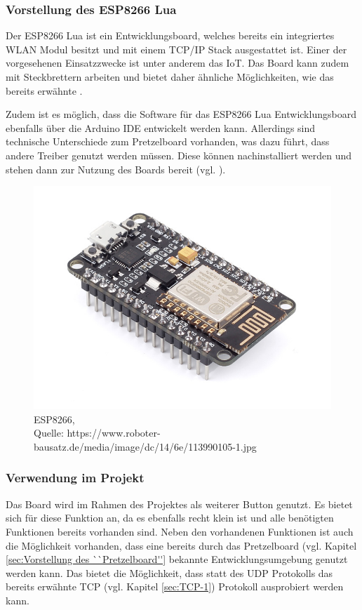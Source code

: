 \subsubsection{Vorstellung des ESP8266 Lua}        
\label{sec:Vorstellung des ESP8266} 

Der ESP8266 Lua ist ein Entwicklungsboard, welches bereits ein integriertes WLAN Modul besitzt und mit einem \ac{TCP}/\ac{IP} Stack ausgestattet ist. Einer der vorgesehenen Einsatzzwecke ist unter anderem das \ac{IoT}. Das Board kann zudem mit Steckbrettern arbeiten und bietet daher ähnliche Möglichkeiten, wie das bereits erwähnte . 

Zudem ist es möglich, dass die Software für das ESP8266 Lua Entwicklungsboard ebenfalls über die Arduino \ac{IDE} entwickelt werden kann. Allerdings sind technische Unterschiede zum Pretzelboard vorhanden, was dazu führt, dass andere Treiber genutzt werden müssen. 
Diese können nachinstalliert werden und stehen dann zur Nutzung des Boards bereit (vgl. \cite{Carius.15.01.2017}\cite{.d}).

\begin{figure}[!htb]
	\centering
	\includegraphics[scale=0.4]{ESP.jpg}
	\caption[ESP8266]{ESP8266,\\ Quelle: https://www.roboter-bausatz.de/media/image/dc/14/6e/113990105-1.jpg}
\end{figure}

\subsubsection{Verwendung im Projekt}        
\label{sec:Verwendung des ESP8266} 
Das Board wird im Rahmen des Projektes als weiterer Button genutzt. Es bietet sich für diese Funktion an, da es ebenfalls recht klein ist und alle benötigten Funktionen bereits vorhanden sind. Neben den vorhandenen Funktionen ist auch die Möglichkeit vorhanden, dass eine bereits durch das Pretzelboard (vgl. Kapitel \ref{sec:Vorstellung des ``Pretzelboard''} bekannte Entwicklungsumgebung genutzt werden kann. Das bietet die Möglichkeit, dass statt des \ac{UDP} Protokolls das bereits erwähnte \ac{TCP} (vgl. Kapitel \ref{sec:TCP-1}) Protokoll ausprobiert werden kann. 


